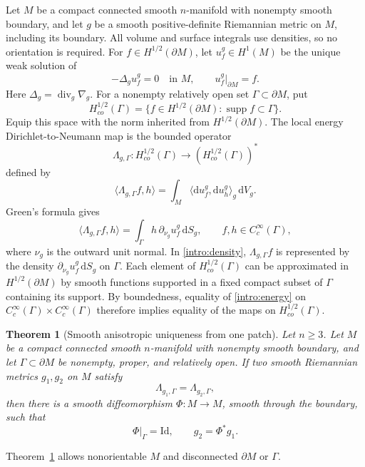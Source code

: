 \documentclass[11pt,a4paper]{article}
\newtheorem{theorem}{Theorem}[section]
\theoremstyle{definition}
\theoremstyle{remark}
\newcommand{\dd}{\mathrm d}
\newcommand{\Id}{\mathrm{Id}}
\DeclareMathOperator{\supp}{supp}
\numberwithin{equation}{section}
\begin{document}
Let $M$ be a compact connected smooth $n$-manifold with nonempty smooth
boundary, and let $g$ be a smooth positive-definite Riemannian metric on
$M$, including its boundary. All volume and surface integrals use
densities, so no orientation is required. For $f\in H^{1/2}(\partial M)$,
let $u_f^g\in H^1(M)$ be the unique weak solution of
\[
 -\Delta_g u_f^g=0\quad\text{in }M,\qquad
 u_f^g|_{\partial M}=f.
\]
Here $\Delta_g=\operatorname{div}_g\nabla_g$. For a nonempty relatively
open set $\Gamma\subset\partial M$, put
\[
 H^{1/2}_{co}(\Gamma)
 =\{f\in H^{1/2}(\partial M):\supp f\subset\Gamma\}.
\]
Equip this space with the norm inherited from $H^{1/2}(\partial M)$.
The local energy Dirichlet-to-Neumann map is the bounded operator
\[
 \Lambda_{g,\Gamma}:H^{1/2}_{co}(\Gamma)
       \longrightarrow (H^{1/2}_{co}(\Gamma))^*
\]
defined by
\begin{equation}\label{intro:energy}
 \langle\Lambda_{g,\Gamma}f,h\rangle
 =\int_M\langle\dd u_f^g,\dd u_h^g\rangle_g\,\dd V_g.
\end{equation}
Green's formula gives
\begin{equation}\label{intro:density}
 \langle\Lambda_{g,\Gamma}f,h\rangle
 =\int_\Gamma h\,\partial_{\nu_g}u_f^g\,\dd S_g,
 \qquad f,h\in C_c^\infty(\Gamma),
\end{equation}
where $\nu_g$ is the outward unit normal. In \eqref{intro:density},
$\Lambda_{g,\Gamma}f$ is represented by the density
$\partial_{\nu_g}u_f^g\,\dd S_g$ on $\Gamma$. Each element of
$H^{1/2}_{co}(\Gamma)$ can be approximated in $H^{1/2}(\partial M)$
by smooth functions supported in a fixed compact subset of $\Gamma$
containing its support. By boundedness, equality of
\eqref{intro:energy} on $C_c^\infty(\Gamma)\times C_c^\infty(\Gamma)$
therefore implies equality of the maps on $H^{1/2}_{co}(\Gamma)$.

\begin{theorem}[Smooth anisotropic uniqueness from one patch]
\label{main:patch}
Let $n\ge3$. Let $M$ be a compact connected smooth $n$-manifold with
nonempty smooth boundary, and let $\Gamma\subset\partial M$ be nonempty,
proper, and relatively open. If two smooth Riemannian metrics $g_1,g_2$
on $M$ satisfy
\[
 \Lambda_{g_1,\Gamma}=\Lambda_{g_2,\Gamma},
\]
then there is a smooth diffeomorphism $\Phi:M\to M$, smooth through
the boundary, such that
\[
 \Phi|_\Gamma=\Id,\qquad g_2=\Phi^*g_1.
\]
\end{theorem}

Theorem~\ref{main:patch} allows nonorientable $M$ and disconnected
$\partial M$ or $\Gamma$.
\end{document}
